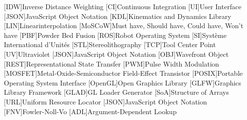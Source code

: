\begin{acronym}[]
        [IDW]{Inverse Distance Weighting}
        [CI]{Continuous Integration}
        [UI]{User Interface}
        [JSON]{JavaScript Object Notation}
        [KDL]{Kinematics and Dynamics Library}
        [LIN]{Linearinterpolation}
        [MoSCoW]{Must have, Should have, Could have, Won't have}
        [PBF]{Powder Bed Fusion}
        [ROS]{Robot Operating System}
        [SI]{Système International d'Unités}
        [STL]{Stereolithography}
        [TCP]{Tool Center Point}
        [UV]{Ultraviolet}
        [JSON]{JavaScript Object Notation}
        [OBJ]{Wavefront Object}
        [REST]{Representational State Transfer}
        [PWM]{Pulse Width Modulation}
        [MOSFET]{Metal-Oxide-Semiconductor Field-Effect Transistor}
        [POSIX]{Portable Operating System Interface}
        [OpenGL]{Open Graphics Library}
        [GLFW]{Graphics Library Framework}
        [GLAD]{GL Loader Generator}
        [SoA]{Structure of Arrays}
        [URL]{Uniform Resource Locator}
        [JSON]{JavaScript Object Notation}
        [FNV]{Fowler-Noll-Vo}
        [ADL]{Argument-Dependent Lookup}
    \end{acronym}